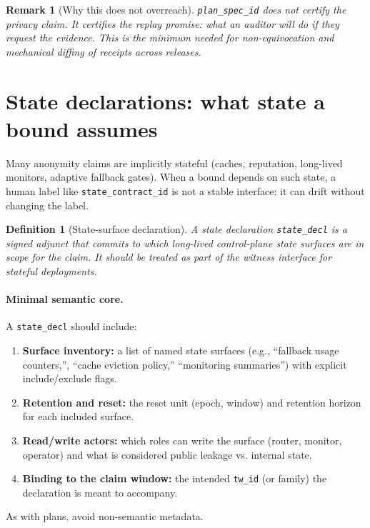 \documentclass[11pt]{article}
\newtheorem{definition}{Definition}
\newtheorem{remark}{Remark}
\begin{document}
\begin{remark}[Why this does not overreach]
\texttt{plan\_spec\_id} does \emph{not} certify the privacy claim.
It certifies the \emph{replay promise}: what an auditor will do if they request the evidence.
This is the minimum needed for non-equivocation and mechanical diffing of receipts across releases.
\end{remark}

\section{State declarations: what state a bound assumes}
Many anonymity claims are implicitly stateful (caches, reputation, long-lived monitors, adaptive fallback gates).
When a bound depends on such state, a human label like \texttt{state\_contract\_id} is not a stable interface:
it can drift without changing the label.

\begin{definition}[State-surface declaration]
A \emph{state declaration} \texttt{state\_decl} is a signed adjunct that commits to which long-lived control-plane state surfaces are in scope for the claim.
It should be treated as part of the witness interface for stateful deployments.\cite{series:state1,series:workedexample}
\end{definition}

\paragraph{Minimal semantic core.}
A \texttt{state\_decl} should include:
\begin{enumerate}[leftmargin=*]
\item \textbf{Surface inventory:} a list of named state surfaces (e.g., ``fallback usage counters,'', ``cache eviction policy,'' ``monitoring summaries'') with explicit include/exclude flags.
\item \textbf{Retention and reset:} the reset unit (epoch, window) and retention horizon for each included surface.
\item \textbf{Read/write actors:} which roles can write the surface (router, monitor, operator) and what is considered public leakage vs. internal state.
\item \textbf{Binding to the claim window:} the intended \texttt{tw\_id} (or family) the declaration is meant to accompany.
\end{enumerate}
As with plans, avoid non-semantic metadata.
\end{document}
